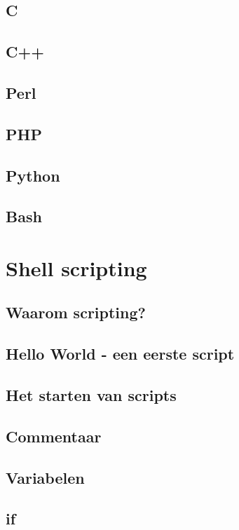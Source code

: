 \documentclass[a4paper,12pt,twoside,openright,titlepage]{book}
\begin{document}
\section{C}
\section{C++}
\section{Perl}
\section{PHP}
\section{Python}
\section{Bash}

\chapter{Shell scripting}

\section{Waarom scripting?}

\section{Hello World - een eerste script}

\section{Het starten van scripts}

\section{Commentaar}

\section{Variabelen}

\section{if}

\end{document}
